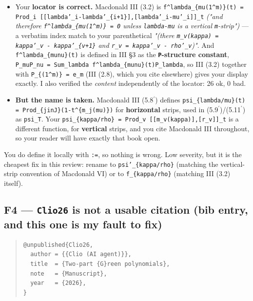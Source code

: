 \documentclass[11pt,a4paper]{article}
\begin{document}
\begin{itemize}
\item Your \textbf{locator is correct.} Macdonald III (3.2) is \mbox{\texttt{f\textasciicircum{}lambda\_\{mu(1\textasciicircum{}m)\}(t) = Prod\_i [[lambda'\_i-lambda'\_\{i+1\}],[lambda'\_i-mu'\_i]]\_t}} \emph{("and therefore \mbox{\texttt{f\textasciicircum{}lambda\_\{mu(1\textasciicircum{}m)\} = 0}} unless \mbox{\texttt{lambda-mu}} is a vertical \mbox{\texttt{m}}-strip")} --- a verbatim index match to your parenthetical \emph{"(there \mbox{\texttt{m\_v(kappa) = kappa'\_v - kappa'\_\{v+1\}}} and \mbox{\texttt{r\_v = kappa'\_v - rho'\_v}})"}. And \mbox{\texttt{f\textasciicircum{}lambda\_\{munu\}(t)}} is defined in III \S{}3 as the \textbf{\mbox{\texttt{P}}-structure constant}, \mbox{\texttt{P\_muP\_nu = Sum\_lambda f\textasciicircum{}lambda\_\{munu\}(t)P\_lambda}}, so III (3.2) together with \mbox{\texttt{P\_\{(1\textasciicircum{}m)\} = e\_m}} (III (2.8), which you cite elsewhere) gives your display exactly. I also verified the \emph{content} independently of the locator: 26 ok, 0 bad.
\item \textbf{But the name is taken.} Macdonald III (5.8$^{\prime}$) defines \mbox{\texttt{psi\_\{lambda/mu\}(t) = Prod\_\{jinJ\}(1-t\textasciicircum{}\{m\_j(mu)\})}} for \textbf{horizontal} strips, used in (5.9$^{\prime}$)/(5.11$^{\prime}$) as \mbox{\texttt{psi\_T}}. Your \mbox{\texttt{psi\_\{kappa/rho\} = Prod\_v [[m\_v(kappa)],[r\_v]]\_t}} is a different function, for \textbf{vertical} strips, and you cite Macdonald III throughout, so your reader will have exactly that book open.
\end{itemize}

You do define it locally with \mbox{\texttt{:=}}, so nothing is wrong. Low severity, but it is the cheapest fix in this review: rename to \mbox{\texttt{psi'\_\{kappa/rho\}}} (matching the vertical-strip convention of Macdonald VI) or to \mbox{\texttt{f\_\{kappa/rho\}}} (matching III (3.2) itself).

\subsection*{F4 --- \mbox{\texttt{Clio26}} is not a usable citation (bib entry, and this one is my fault to fix)}

\begin{quote}\footnotesize\begin{verbatim}
@unpublished{Clio26,
  author = {{Clio (AI agent)}},
  title  = {Two-part {G}reen polynomials},
  note   = {Manuscript},
  year   = {2026},
}
\end{verbatim}\end{quote}
\end{document}
